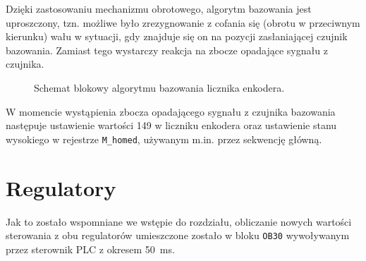 Dzięki zastosowaniu mechanizmu obrotowego, algorytm bazowania jest uproszczony, tzn. możliwe było zrezygnowanie z cofania się (obrotu w przeciwnym kierunku) wału w sytuacji, gdy znajduje się on na pozycji zasłaniającej czujnik bazowania. Zamiast tego wystarczy reakcja na zbocze opadające sygnału z czujnika.

\begin{figure}[ht]
    \centering
    
    
    \caption{Schemat blokowy algorytmu bazowania licznika enkodera.}
    \label{fig:schemat_bazowania}
\end{figure}

W momencie wystąpienia zbocza opadającego sygnału z czujnika bazowania następuje ustawienie wartości \num{149} w liczniku enkodera oraz ustawienie stanu wysokiego w rejestrze \texttt{M\_homed}, używanym m.in. przez sekwencję główną.

\section{Regulatory}
\label{sec:ch7_regulatory}

Jak to zostało wspomniane we wstępie do rozdziału, obliczanie nowych wartości sterowania z obu regulatorów umieszczone zostało w bloku \texttt{OB30} wywoływanym przez sterownik PLC z okresem \SI{50}{\milli\second}.

